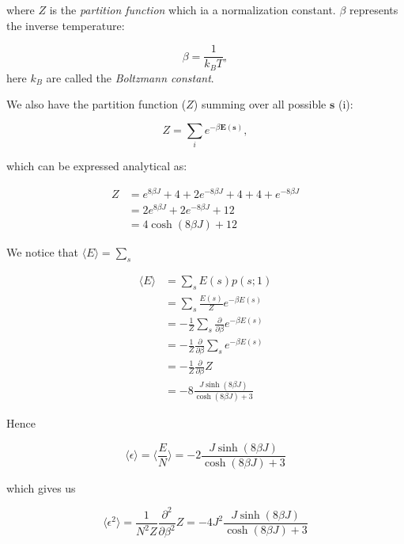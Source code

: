 \documentclass[english,notitlepage,reprint,nofootinbib]{revtex4-1}  %
\begin{document}
where $Z$ is the \textit{partition function} which ia a normalization constant. $\beta$ represents the inverse temperature:

\begin{equation}
    \beta = \frac{1}{k_B T},
\end{equation}
here $k_B$ are called the \textit{Boltzmann constant}.

We also have the partition function ($Z$) summing over all possible $\textbf{s}$ (i):

\begin{equation}
    Z = \sum\limits_{i} e^{- \beta \mathbf{E}(\mathbf{s})},
\end{equation}

which can be expressed analytical as:

\begin{align*}
    Z %
    &= e^{8 \beta J} + 4 + 2 e^{-8 \beta J} + 4 + 4 + e^{-8 \beta J} \\
    &= 2e^{8 \beta J} + 2e^{-8 \beta J} + 12 \\
    &= 4 \cosh (8 \beta J) + 12
\end{align*}

We notice that $\langle E\rangle = \sum\limits_{s}$

\begin{align*}
    \langle E\rangle &= \sum\limits_{s} E(s) p(s;1)\\
    &= \sum\limits_{s} \frac{E(s)}{Z} e^{- \beta E(s)} \\
    &= - \frac{1}{Z} \sum\limits_{s} \frac{\partial}{\partial \beta} e^{- \beta E(s)} \\
    &= - \frac{1}{Z} \frac{\partial}{\partial \beta} \sum\limits_{s} e^{- \beta E(s)} \\
    &= - \frac{1}{Z} \frac{\partial}{\partial \beta} Z \\
    &= -8 \frac{J \sinh (8 \beta J)}{\cosh (8 \beta J) + 3}
\end{align*}

Hence

\begin{equation}
    \langle \epsilon\rangle = \langle \frac{E}{N}\rangle = -2 \frac{J \sinh (8 \beta J)}{\cosh (8 \beta J) + 3}
\end{equation}

which gives us

\begin{equation}
    \langle \epsilon^2\rangle  = \frac{1}{N^2 Z} \frac{\partial^2}{\partial \beta^2} Z = -4 J^2 \frac{J \sinh (8 \beta J)}{\cosh (8 \beta J) + 3}
\end{equation}
\end{document}
